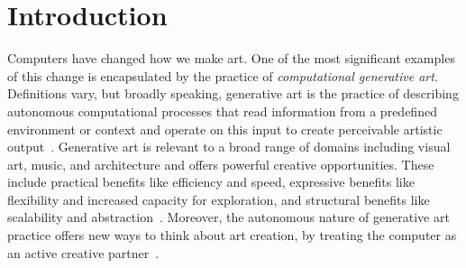 \documentclass{sigchi}
\begin{document}
\section{Introduction}
Computers have changed how we make art. One of the most significant examples of this change is encapsulated by the practice of \textit{computational generative art}. Definitions vary, but broadly speaking, generative art is the practice of describing autonomous computational processes that read information from a predefined environment or context and operate on this input to create perceivable artistic output~\cite{shiffman2012nature,reas2010form,doi:10.1080/14626268.2012.709940}. Generative art is relevant to a broad range of domains including visual art, music, and architecture and offers powerful creative opportunities. These include practical benefits like efficiency and speed, expressive benefits like flexibility and increased capacity for exploration, and structural benefits like scalability and abstraction~\cite{mitchell1990}. Moreover, the autonomous nature of generative art practice offers new ways to think about art creation, by treating the computer as an active creative partner~\cite{reas2010form}. 
\end{document}
